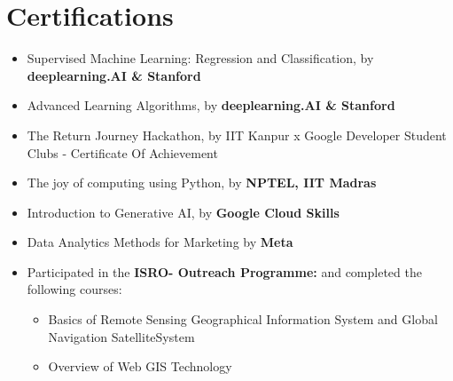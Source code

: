 \documentclass[10.8pt, a4paper]{extarticle}
\newcommand{\shorterSection}[1]{\vspace{-10pt}\section{#1}}
\begin{document}
\shorterSection{Certifications}
\begin{itemize}

\item Supervised Machine Learning: Regression and Classification, by \textbf{deeplearning.AI \& Stanford } \href{https://www.coursera.org/account/accomplishments/certificate/TECTFLUN93UC}{\faLink{}}\\[-0.6cm]

\item Advanced Learning Algorithms, by \textbf{deeplearning.AI \& Stanford } \href{https://www.coursera.org/account/accomplishments/certificate/PLNJXZ9JXVXJ}{\faLink{}}\\[-0.6cm]

\item The Return Journey Hackathon, by IIT Kanpur x Google Developer Student Clubs - Certificate Of Achievement \href{https://drive.google.com/file/d/1J4PNmZKNsVgmEhSCm27sZNX8vNFhKZRA/view?usp=drive_link}{\faLink{}}\\[-0.6cm] 

\item The joy of computing using Python, by \textbf{NPTEL, IIT Madras }  \href{https://drive.google.com/file/d/1-0Q_gA_cl3bb7sPyZOA3OtV0fbmRLQvz/view?usp=sharing}{\faLink{}}\\[-0.6cm]

\item Introduction to Generative AI, by \textbf{Google Cloud Skills }\href{https://www.cloudskillsboost.google/public_profiles/76755a5d-f18b-4787-89db-bd6be0b3e066/badges/4178524}{\faLink{}}\\[-0.6cm]

\item Data Analytics Methods for Marketing by \textbf{Meta}\href{https://www.coursera.org/account/accomplishments/certificate/JPUQ5DJBDZN6}{\faLink{}}\\[-0.6cm]

\item Participated in the \textbf{ISRO- Outreach Programme:}  and completed the following courses: 
\begin{itemize}
    \item Basics of Remote Sensing Geographical Information System and Global Navigation SatelliteSystem \href{https://drive.google.com/file/d/15E-FXqYPGD-uRhFIRUu4WKobbqnBvlAh/view?usp=sharing}{\faLink{}}
    
    \item Overview of Web GIS Technology \href{https://drive.google.com/file/d/1bQc-tYUv5at-NuImsrSm_pfTs4rRgWi2/view?usp=drive_link}{\faLink{}}
    

\end{itemize}
\end{itemize}
\end{document}
